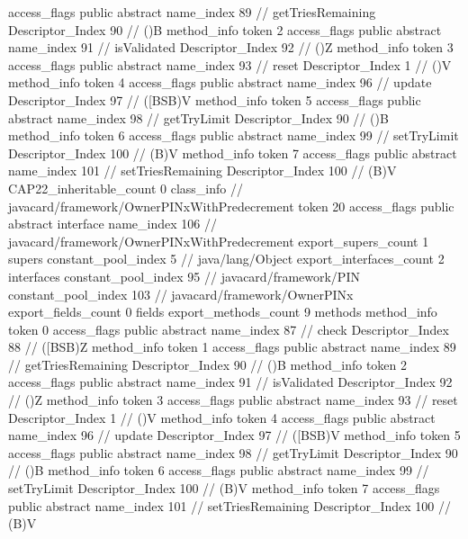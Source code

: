 {{{{{					access_flags	public abstract
					name_index	89		// getTriesRemaining
					Descriptor_Index	90		// ()B
				}
				method_info {
					token	2
					access_flags	public abstract
					name_index	91		// isValidated
					Descriptor_Index	92		// ()Z
				}
				method_info {
					token	3
					access_flags	public abstract
					name_index	93		// reset
					Descriptor_Index	1		// ()V
				}
				method_info {
					token	4
					access_flags	public abstract
					name_index	96		// update
					Descriptor_Index	97		// ([BSB)V
				}
				method_info {
					token	5
					access_flags	public abstract
					name_index	98		// getTryLimit
					Descriptor_Index	90		// ()B
				}
				method_info {
					token	6
					access_flags	public abstract
					name_index	99		// setTryLimit
					Descriptor_Index	100		// (B)V
				}
				method_info {
					token	7
					access_flags	public abstract
					name_index	101		// setTriesRemaining
					Descriptor_Index	100		// (B)V
				}
			}
			CAP22_inheritable_count	0
		}
		class_info {		// javacard/framework/OwnerPINxWithPredecrement
			token	20
			access_flags	public abstract interface
			name_index	106		// javacard/framework/OwnerPINxWithPredecrement
			export_supers_count	1
			supers {
				constant_pool_index	5		// java/lang/Object
			}
			export_interfaces_count	2
			interfaces {
				constant_pool_index	95		// javacard/framework/PIN
				constant_pool_index	103		// javacard/framework/OwnerPINx
			}
			export_fields_count	0
			fields {
			}
			export_methods_count	9
			methods {
				method_info {
					token	0
					access_flags	public abstract
					name_index	87		// check
					Descriptor_Index	88		// ([BSB)Z
				}
				method_info {
					token	1
					access_flags	public abstract
					name_index	89		// getTriesRemaining
					Descriptor_Index	90		// ()B
				}
				method_info {
					token	2
					access_flags	public abstract
					name_index	91		// isValidated
					Descriptor_Index	92		// ()Z
				}
				method_info {
					token	3
					access_flags	public abstract
					name_index	93		// reset
					Descriptor_Index	1		// ()V
				}
				method_info {
					token	4
					access_flags	public abstract
					name_index	96		// update
					Descriptor_Index	97		// ([BSB)V
				}
				method_info {
					token	5
					access_flags	public abstract
					name_index	98		// getTryLimit
					Descriptor_Index	90		// ()B
				}
				method_info {
					token	6
					access_flags	public abstract
					name_index	99		// setTryLimit
					Descriptor_Index	100		// (B)V
				}
				method_info {
					token	7
					access_flags	public abstract
					name_index	101		// setTriesRemaining
					Descriptor_Index	100		// (B)V
}}}}}
